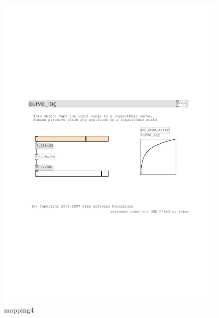 \documentclass{ppgmus}
\begin{document}
\begin{figure}
\includegraphics[scale=.4]{mapping4}
\caption{mapping4}
\label{mapping4}
\end{figure}
\end{document}
